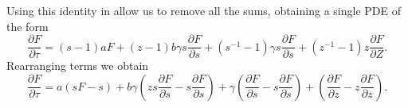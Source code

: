 Using this identity in  allow us to remove all the
sums, obtaining a single PDE of the form
\begin{equation}
\frac{\partial F}{\partial \tau} =
(s - 1) a F + (z - 1) b \gamma s \frac{\partial F}{\partial s}
+ \left( s^{-1} - 1 \right) \gamma s \frac{\partial F}{\partial s}
+ \left( z^{-1} - 1 \right) z \frac{\partial F}{\partial Z}.
\end{equation}
Rearranging terms we obtain
\begin{equation}
\frac{\partial F}{\partial \tau} =
a (sF - s)
+ b \gamma \left( z s \frac{\partial F}{\partial s} - s \frac{\partial
F}{\partial s} \right)
+ \gamma \left( \frac{\partial F}{\partial s} - s \frac{\partial F}{\partial s}
\right)
+ \left( \frac{\partial F}{\partial z} - z \frac{\partial F}{\partial z}
\right).
\end{equation}
